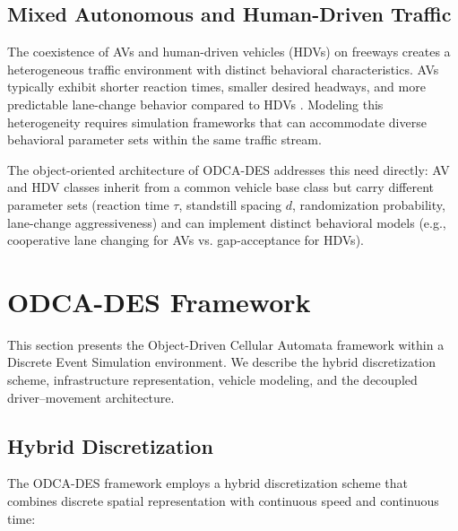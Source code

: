 \documentclass[review,number]{elsarticle} %
\begin{document}
\subsection{Mixed Autonomous and Human-Driven Traffic}
\label{sec:lit_mixed}

The coexistence of AVs and human-driven vehicles (HDVs) on freeways creates a heterogeneous traffic environment with distinct behavioral characteristics. AVs typically exhibit shorter reaction times, smaller desired headways, and more predictable lane-change behavior compared to HDVs \citep{talebpour2016influence, shladover2012impacts, vanarem2006effects}. Modeling this heterogeneity requires simulation frameworks that can accommodate diverse behavioral parameter sets within the same traffic stream.

The object-oriented architecture of ODCA-DES addresses this need directly: AV and HDV classes inherit from a common vehicle base class but carry different parameter sets (reaction time $\tau$, standstill spacing $d$, randomization probability, lane-change aggressiveness) and can implement distinct behavioral models (e.g., cooperative lane changing for AVs vs. gap-acceptance for HDVs).


\section{ODCA-DES Framework}
\label{sec:framework}

This section presents the Object-Driven Cellular Automata framework within a Discrete Event Simulation environment. We describe the hybrid discretization scheme, infrastructure representation, vehicle modeling, and the decoupled driver--movement architecture.

\subsection{Hybrid Discretization}
\label{sec:discretization}

The ODCA-DES framework employs a hybrid discretization scheme that combines discrete spatial representation with continuous speed and continuous time:
\end{document}
